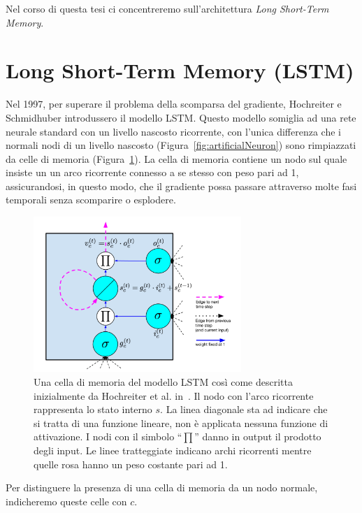 Nel corso di questa tesi ci concentreremo sull'architettura \emph{Long Short-Term Memory}.

\section{Long Short-Term Memory (LSTM)}
Nel 1997, per superare il problema della scomparsa del gradiente, Hochreiter e Schmidhuber introdussero il modello LSTM.
Questo modello somiglia ad una rete neurale standard con un livello nascosto ricorrente, con l'unica differenza che i normali nodi di un livello nascosto (Figura~\ref{fig:artificialNeuron}) sono rimpiazzati da celle di memoria (Figura~\ref{fig:memoryCell}). %
La cella di memoria contiene un nodo sul quale insiste un un arco ricorrente connesso a se stesso con peso pari ad 1, assicurandosi, in questo modo, che il gradiente possa passare attraverso molte fasi temporali senza scomparire o esplodere.

\begin{figure}[tp]
  \centering
  \begin{center}
    \includegraphics[width=0.7\textwidth]{./images/memoryCell.png}
  \end{center}
  \caption{Una cella di memoria del modello LSTM cos\`i come descritta inizialmente da Hochreiter et al. in~\cite{Hochreiter:1997}.
  Il nodo con l'arco ricorrente rappresenta lo stato interno $s$.
  La linea diagonale sta ad indicare che si tratta di una funzione lineare, non \`e applicata nessuna funzione di attivazione.
  I nodi con il simbolo ``$\prod$'' danno in output il prodotto degli input.
  Le linee tratteggiate indicano archi ricorrenti mentre quelle rosa hanno un peso costante pari ad 1.}
  \label{fig:memoryCell}
\end{figure}

Per distinguere la presenza di una cella di memoria da un nodo normale, indicheremo queste celle con $c$.

